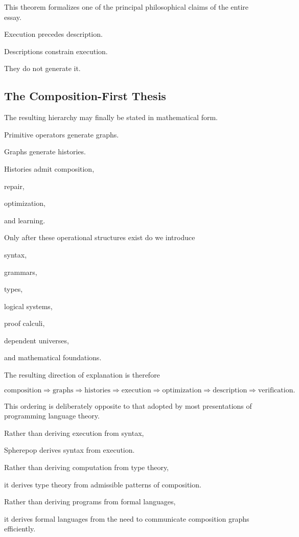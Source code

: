\documentclass[12pt,oneside]{article}
\begin{document}
This theorem formalizes one of the principal philosophical claims of the entire essay.

Execution precedes description.

Descriptions constrain execution.

They do not generate it.

\subsection{The Composition-First Thesis}

The resulting hierarchy may finally be stated in mathematical form.

Primitive operators generate graphs.

Graphs generate histories.

Histories admit composition,

repair,

optimization,

and learning.

Only after these operational structures exist do we introduce

syntax,

grammars,

types,

logical systems,

proof calculi,

dependent universes,

and mathematical foundations.

The resulting direction of explanation is therefore

\[
\text{composition}
\Longrightarrow
\text{graphs}
\Longrightarrow
\text{histories}
\Longrightarrow
\text{execution}
\Longrightarrow
\text{optimization}
\Longrightarrow
\text{description}
\Longrightarrow
\text{verification}.
\]

This ordering is deliberately opposite to that adopted by most presentations of programming language theory.

Rather than deriving execution from syntax,

Spherepop derives syntax from execution.

Rather than deriving computation from type theory,

it derives type theory from admissible patterns of composition.

Rather than deriving programs from formal languages,

it derives formal languages from the need to communicate composition graphs efficiently.
\end{document}

